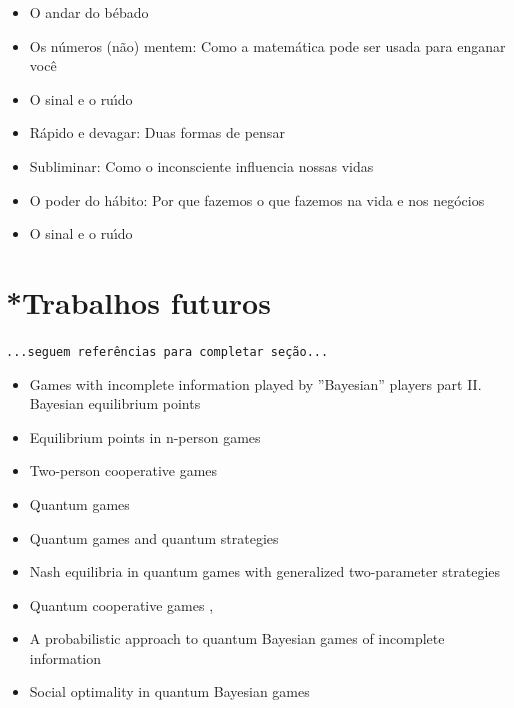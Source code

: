 \documentclass[
	article,			        %
	11pt,				          %
	oneside,			        %
	a4paper,			        %
	english,			        %
	brazil,				        %
	sumario=tradicional
]{abntex2}\usepackage[]{graphicx}\usepackage[]{color}
\begin{document}
  \begin{itemize}
    \item O andar do b\'ebado \cite{Mlodinow.2009}
    \item Os n\'umeros (n\~ao) mentem: Como a matem\'atica pode ser usada para enganar voc\^e \cite{Seife.2012}
    \item O sinal e o ru\'{\i}do \cite{Nate.2012}
    \item R{\'a}pido e devagar: Duas formas de pensar \cite{Kahneman.2012}
    \item Subliminar: Como o inconsciente influencia nossas vidas \cite{Mlodinow.2013}
    \item O poder do h{\'a}bito: Por que fazemos o que fazemos na vida e nos neg{\'o}cios \cite{Duhigg.2012}
    \item O sinal e o ru\'{\i}do \cite{Nate.2012}
  \end{itemize}

\section{*Trabalhos futuros}

\texttt{\color{red}...seguem referências para completar seção...}

  \begin{itemize}
  
    \item Games with incomplete information played by ''Bayesian'' players part II. Bayesian equilibrium points \cite{Harsanyi.1968}
    
    \item Equilibrium points in n-person games \cite{Nash.1950}
    \item Two-person cooperative games \cite{Nash.1953}
    \item Quantum games \cite{JoseFigueiredo.2004}
    \item Quantum games and quantum strategies \cite{Eisert.1999}
    \item Nash equilibria in quantum games with generalized two-parameter strategies \cite{Flitney.2007}
    \item Quantum cooperative games \cite{Iqbal.2002},\cite{Dai.2004}
    \item A probabilistic approach to quantum Bayesian games of incomplete information \cite{Iqbal.2014}
    \item Social optimality in quantum Bayesian games \cite{Azhar.2015}
    
  \end{itemize}


\postextual





\end{document}
